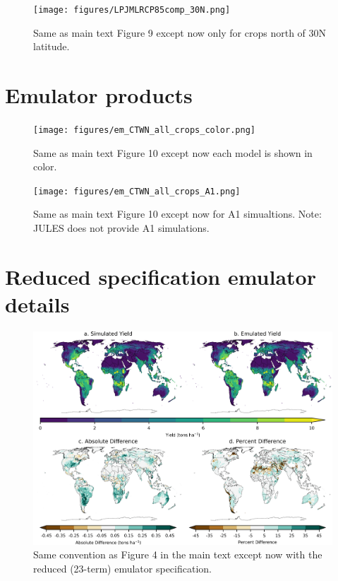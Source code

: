 \documentclass[10pt]{article}
\begin{document}
\begin{figure}[ht]
  \centering
  \texttt{[image: figures/LPJMLRCP85comp\_30N.png]}
  \caption{
  Same as main text Figure 9 except now only for crops north of 30N latitude.
  }
  \label{fig:lpjmlrcp}
\end{figure}


\clearpage
\section{Emulator products}

\begin{figure}[ht]
  \centering
  \texttt{[image: figures/em\_CTWN\_all\_crops\_color.png]}
  \caption{
  Same as main text Figure 10 except now each model is shown in color.
  }
  \label{fig:all_dims}
\end{figure}

\begin{figure}[ht]
  \centering
  \texttt{[image: figures/em\_CTWN\_all\_crops\_A1.png]}
  \caption{
  Same as main text Figure 10 except now for A1 simualtions. Note: JULES does not provide A1 simulations.
  }
  \label{fig:all_dims}
\end{figure}


\clearpage
\section{Reduced specification emulator details}

\begin{figure}[h!]
\centering
\includegraphics[width=15.5cm]{reduced_lpjml_maize.png}
\caption{Same convention as Figure 4 in the main text except now with the reduced (23-term) emulator specification.}
\label{fig:reducedlpjml}
\end{figure}
\end{document}
